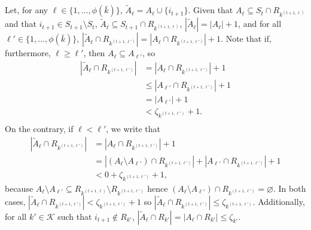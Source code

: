 \documentclass[
  11pt,
  a4paper,
]{article}
\theoremstyle{plain}
\theoremstyle{definition}
\theoremstyle{plain}
\theoremstyle{definition}
\theoremstyle{plain}
\theoremstyle{remark}
\begin{document}
Let, for any \(\ell\in\{1,\dotsc, \phi(\bar k)\}\),
\(\widetilde A_\ell=A_\ell \cup \{ i_{t+1}\}\). Given that
\(A_\ell\subseteq S_t\cap R_{k^{(t+1,\ell)}}\) and that
\(i_{t+1}\in S_{t+1}\setminus S_t\),
\(\widetilde A_\ell\subseteq S_{t+1}\cap R_{k^{(t+1,\ell)}}\),
\(|\widetilde A_\ell|=| A_\ell|+1\), and for all
\(\ell'\in\{1,\dotsc, \phi(\bar k)\}\),
\(|\widetilde A_\ell \cap R_{k^{(t+1,\ell')}} |=| A_\ell\cap R_{k^{(t+1,\ell')}}|+1\).
Note that if, furthermore, \(\ell\geq \ell'\), then
\(A_\ell\subseteq A_{\ell'}\), so \begin{align*}
|\widetilde A_\ell \cap R_{k^{(t+1,\ell')}} |&=| A_\ell\cap R_{k^{(t+1,\ell')}}|+1\\
&\leq | A_{\ell'}\cap R_{k^{(t+1,\ell')}}|+1\\
&= | A_{\ell'}|+1\\
&<\zeta_{k^{(t+1,\ell')}}+1.\\
\end{align*} On the contrary, if \(\ell< \ell'\), we write that
\begin{align*}
|\widetilde A_\ell \cap R_{k^{(t+1,\ell')}} |&=| A_\ell\cap R_{k^{(t+1,\ell')}}|+1\\
&= | (A_{\ell}\setminus A_{\ell'}) \cap R_{k^{(t+1,\ell')}}   | + | A_{\ell'}\cap R_{k^{(t+1,\ell')}}|+1\\
&<  0 +  \zeta_{k^{(t+1,\ell')}} +1,
\end{align*} because
\(A_{\ell}\setminus A_{\ell'} \subseteq   R_{k^{(t+1,\ell)}}\setminus  R_{k^{(t+1,\ell')}}\)
hence
\((A_{\ell}\setminus A_{\ell'}) \cap R_{k^{(t+1,\ell')}}  =\varnothing\).
In both cases,
\(|\widetilde A_\ell \cap R_{k^{(t+1,\ell')}} |< \zeta_{k^{(t+1,\ell')}} +1\)
so
\(|\widetilde A_\ell \cap R_{k^{(t+1,\ell')}} |\leq \zeta_{k^{(t+1,\ell')}}\).
Additionally, for all \(k'\in\mathcal{K}\) such that
\(i_{t+1}\not\in R_{k'}\),
\(|\widetilde A_\ell \cap R_{k'} |=| A_\ell \cap R_{k'} |\leq \zeta_{k'}\).
\end{document}
